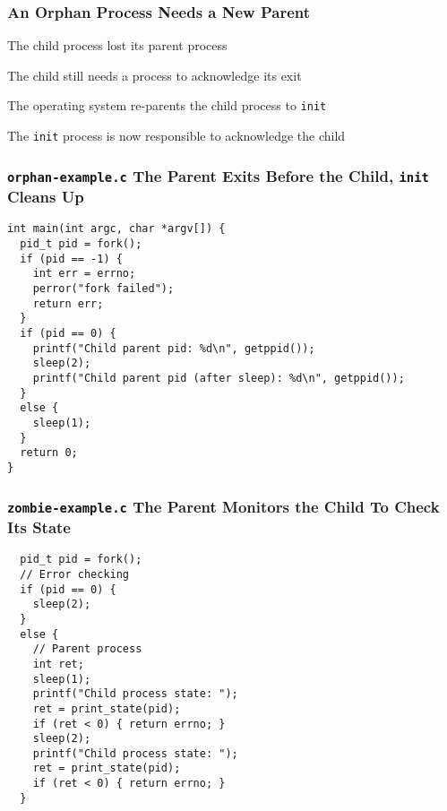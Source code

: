   \begin{frame}
    \frametitle{An Orphan Process Needs a New Parent}

    The child process lost its parent process

    \hspace{2em} The child still needs a process to acknowledge its exit

    \vspace{2em}

    The operating system re-parents the child process to \texttt{init}

    \hspace{2em} The \texttt{init} process is now responsible to acknowledge the
                 child
  \end{frame}

  \begin{frame}[fragile]
    \frametitle{\texttt{orphan-example.c} The Parent Exits Before the Child, \texttt{init} Cleans Up}

    \begin{lstlisting}
int main(int argc, char *argv[]) {
  pid_t pid = fork();
  if (pid == -1) {
    int err = errno;
    perror("fork failed");
    return err;
  }
  if (pid == 0) {
    printf("Child parent pid: %d\n", getppid());
    sleep(2);
    printf("Child parent pid (after sleep): %d\n", getppid());
  }
  else {
    sleep(1);
  }
  return 0;
}

    \end{lstlisting}
  \end{frame}

  \begin{frame}[fragile]
    \frametitle{\texttt{zombie-example.c} The Parent Monitors the Child To Check Its State}

    \begin{lstlisting}
  pid_t pid = fork();
  // Error checking
  if (pid == 0) {
    sleep(2);
  }
  else {
    // Parent process
    int ret;
    sleep(1);
    printf("Child process state: ");
    ret = print_state(pid);
    if (ret < 0) { return errno; }
    sleep(2);
    printf("Child process state: ");
    ret = print_state(pid);
    if (ret < 0) { return errno; }
  }
    \end{lstlisting}
  \end{frame}

